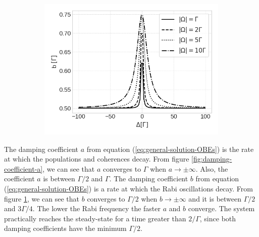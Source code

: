{\begin{figure}[H]
\begin{subfigure}[t]{0.48\textwidth}
		\includegraphics[width=1.0\textwidth]{USPSC-img/damping_coefficient_b.png}
		\vspace{-5pt}
		\label{fig:damping-coefficient-b}
	\end{subfigure}

	\label{fig:damping-coefficients}
	\vspace{-30pt}
\end{figure}
The damping coefficient $ a $ from equation (\ref{eq:general-solution-OBEs}) is the rate at which the populations and coherences decay. From figure \ref{fig:damping-coefficient-a}, we can see that $ a $ converges to $ \Gamma $ when $ a \rightarrow \pm \infty $. Also, the coefficient $ a $ is between $ \Gamma/2 $ and $ \Gamma $. The damping coefficient $ b $ from equation (\ref{eq:general-solution-OBEs}) is a rate at which the Rabi oscillations decay. From figure \ref{fig:damping-coefficient-b}, we can see that $ b $ converges to $ \Gamma / 2 $ when $ b \rightarrow \pm \infty $ and it is between $ \Gamma / 2 $ and $ 3\Gamma/4 $. The lower the Rabi frequency the faster $ a $ and $ b $ converge. The system practically reaches the steady-state for a time greater than $ 2 / \Gamma $, since both damping coefficients have the minimum $ \Gamma / 2 $. 

}
